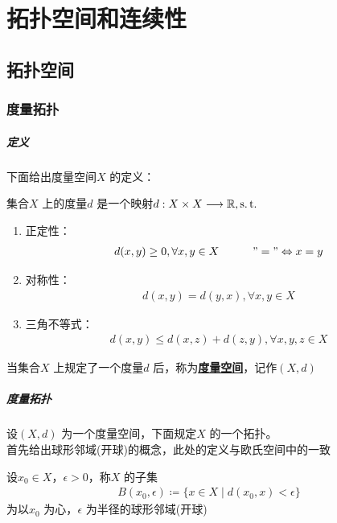\ifx\allfiles\undefined


	\else
	\fi
\chapter{拓扑空间和连续性}

\section{拓扑空间}
\subsection{度量拓扑}
\paragraph{定义}
	下面给出度量空间$X$ 的定义：
	\begin{defn}\label{def 1.1.1}
		集合$X$ 上的度量$d$ 是一个映射$d : X \times X \longrightarrow \mathbb{R} , \operatorname{s.t.}$
		\begin{enumerate}
			\item[\rmnum{1}] 正定性：
			\begin{align}
				d(x , y) \geq 0 , \forall x , y \in X \hspace*{3em} "=" \Leftrightarrow x = y
			\end{align}
			
			\item[\rmnum{2}] 对称性：
			\begin{align}
				d(x , y) = d(y , x) , \forall x , y \in X
			\end{align}
		
			\item[\rmnum{3}] 三角不等式：
			\begin{align}
				d(x , y) \leq d(x , z) + d(z , y) , \forall x , y , z \in X
			\end{align}
		\end{enumerate}
		当集合$X$ 上规定了一个度量$d$ 后，称为\underline{\textbf{度量空间}}，记作$(X , d)$
	\end{defn}
	
\paragraph{度量拓扑}
	设$(X , d)$ 为一个度量空间，下面规定$X$ 的一个拓扑。\\
	首先给出球形邻域(开球)的概念，此处的定义与欧氏空间中的一致
	\begin{defn}\label{def 1.1.2}
		设$x_0 \in X$，$\epsilon > 0$，称$X$ 的子集
		\begin{align}
			B(x_0 , \epsilon) \coloneqq \{ x \in X \mid d(x_0 , x) < \epsilon \}
		\end{align}
		为以$x_0$ 为心，$\epsilon$ 为半径的球形邻域(开球)
	\end{defn}

